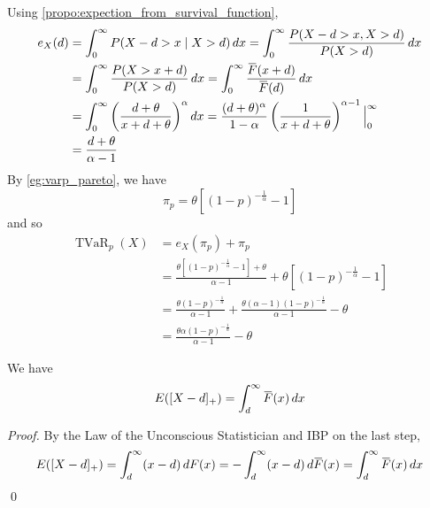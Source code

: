 \documentclass[notoc,notitlepage]{tufte-book}
\DeclareMathOperator{\TVaR}{TVaR}
\begin{document}
\begin{solution}
  Using \cref{propo:expection_from_survival_function},
  \begin{align*}
    e_X(d) &= \int_{0}^{\infty} P(X - d > x \mid X > d) \dif{x} = \int_{0}^{\infty} \frac{P(X - d > x, X > d)}{P(X > d)} \dif{x} \\
           &= \int_{0}^{\infty} \frac{P(X > x + d)}{P(X > d)} \dif{x} = \int_{0}^{\infty} \frac{\bar{F}(x + d)}{\bar{F}(d)} \dif{x} \\
           &= \int_{0}^{\infty} \left( \frac{d + \theta}{x + d + \theta} \right)^\alpha \dif{x} = \frac{( d + \theta )^\alpha}{1 - \alpha} \left( \frac{1}{x + d + \theta} \right)^{ \alpha - 1 } \at{0}{\infty} \\
           &= \frac{d + \theta}{\alpha - 1}
  \end{align*}
  By \cref{eg:varp_pareto}, we have
  \begin{equation*}
    \pi_p = \theta \left[ ( 1 - p )^{-\frac{1}{\alpha}} - 1 \right]
  \end{equation*}
  and so
  \begin{align*}
    \TVaR_p(X) &= e_X(\pi_p) + \pi_p \\
               &= \frac{\theta\left[ (1 - p)^{-\frac{1}{\alpha}} - 1 \right] + \theta}{\alpha - 1} + \theta\left[ ( 1 - p )^{-\frac{1}{\alpha}} - 1 \right] \\
               &= \frac{\theta(1 - p)^{-\frac{1}{\alpha}}}{\alpha - 1} + \frac{\theta(\alpha - 1)(1 - p)^{-\frac{1}{\alpha}}}{\alpha - 1} - \theta \\
               &= \frac{\theta \alpha ( 1 - p )^{-\frac{1}{\alpha}}}{\alpha - 1} - \theta
  \end{align*}
\end{solution}

\begin{propo}
\label{propo:expected_deductible}
  We have
  \begin{equation*}
    E( [ X - d ]_+ ) = \int_{d}^{\infty} \bar{F}(x) \dif{x}
  \end{equation*}
\end{propo}

\begin{proof}
  By the Law of the Unconscious Statistician and IBP on the last step,
  \begin{equation*}
    E( [ X - d ]_+ ) = \int_{d}^{\infty} ( x - d ) \dif{F(x)} = - \int_{d}^{\infty} (x - d) \dif{\bar{F}(x)} = \int_{d}^{\infty} \bar{F}(x) \dif{x}
  \end{equation*}\qed
\end{proof}
\end{document}
